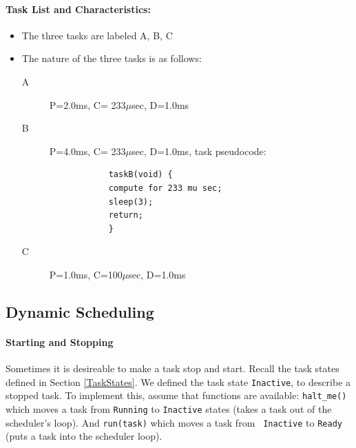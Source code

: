 \paragraph{Task List and Characteristics:} 
\begin{itemize}
\item The three tasks are labeled A, B, C
\item The nature of the three tasks is as follows:
    \begin{description}
      \item [A] P=2.0ms, C= 233$\mu$sec, D=1.0ms
      \item [B] P=4.0ms, C= 233$\mu$sec, D=1.0ms, task pseudocode: 
\begin{verbatim}
            taskB(void) {
            compute for 233 mu sec;
            sleep(3);
            return;
            }
\end{verbatim}
      \item [C]  P=1.0ms, C=100$\mu$sec, D=1.0ms  
    \end{description}
\end{itemize}






\subsection*{Dynamic Scheduling}

\paragraph{Starting and Stopping}
Sometimes it is desireable to make a task stop and start. Recall the task states defined in 
Section \ref{TaskStates}.  We defined the
task state {\tt Inactive}, to describe a stopped task.  To implement
this, assume
that functions are available: {\tt halt\_me()} which moves a task from
{\tt Running} to
{\tt Inactive} states (takes a task out of the
scheduler's loop).  And {\tt run(task)} which moves a task from {\tt
Inactive} to {\tt Ready} (puts a task into the
scheduler loop).

%
%
%
%
%

